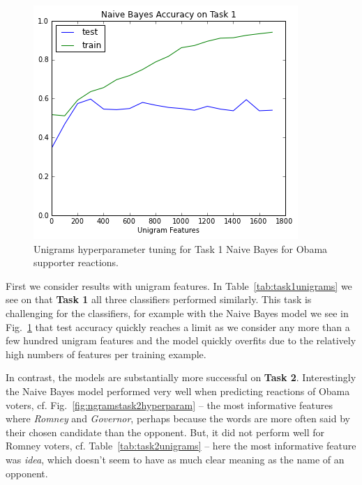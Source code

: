 \begin{figure}[]
	\centering
	\includegraphics[scale=0.55]{Figures/ngrams_hyperparam_task1.png}
	\caption{Unigrams hyperparameter tuning for Task 1 Naive Bayes for Obama supporter reactions.}
	\label{fig:ngramstask1hyperparam}
\end{figure}

First we consider results with unigram features. In Table~\ref{tab:task1unigrams} we see on that \textbf{Task 1} all three classifiers performed similarly.  This task is challenging for the classifiers, for example with the Naive Bayes model we see in Fig.~\ref{fig:ngramstask1hyperparam} that test accuracy quickly reaches a limit as we consider any more than a few hundred unigram features and the model quickly overfits due to the relatively high numbers of features per training example.

In contrast, the models are substantially more successful on \textbf{Task 2}.  Interestingly the Naive Bayes model performed very well when predicting reactions of Obama voters, cf. Fig.~\ref{fig:ngramstask2hyperparam} -- the most informative features where \emph{Romney} and \emph{Governor}, perhaps because the words are more often said by their chosen candidate than the opponent.  But, it did not perform well for Romney voters, cf. Table~\ref{tab:task2unigrams} -- here the most informative feature was \emph{idea}, which doesn't seem to have as much clear meaning as the name of an opponent. 

